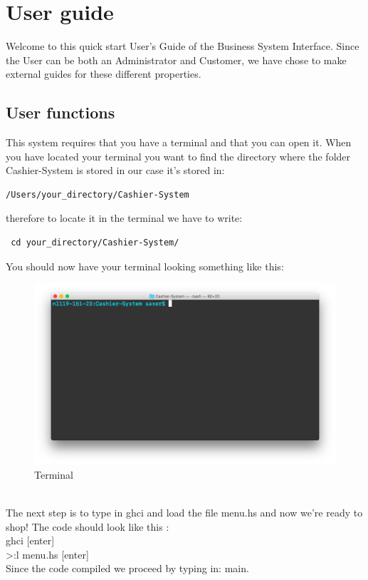 \documentclass[11pt]{article}
\begin{document}
\section{User guide}
Welcome to this quick start User's Guide of the Business System Interface. Since the User can be both an Administrator and Customer, we have chose to make external guides for these different properties.
\subsection{User functions}
This system requires that you have a terminal and that you can open it. When you have located your terminal you want to find the directory where the folder Cashier-System is stored in our case it’s stored in:
\begin{lstlisting}
/Users/your_directory/Cashier-System
\end{lstlisting}
 therefore to locate it in the terminal we have to write:
\begin{lstlisting}
 cd your_directory/Cashier-System/
\end{lstlisting}
You should now have your terminal looking something like this:
\\
\begin{figure}[h]
  \includegraphics[width=\linewidth]{interface1.png}
  \caption{Terminal}
  \label{fig:Terminal}
\end{figure}
\\
\newpage
The next step is to type in ghci and load the file menu.hs and now we’re ready to shop! The code should look like this :\\
ghci [enter]\\
>:l menu.hs [enter]\\
Since the code compiled we proceed by typing in: main.\\\\
\end{document}
